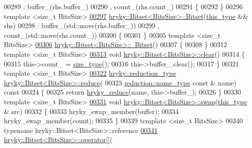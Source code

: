 \begin{DoxyCode}
00289     : buffer\_(rhs.buffer\_)
00290       , count\_(rhs.count\_)
00291 \{
00292 \}
00296 \textcolor{keyword}{template} <\textcolor{keywordtype}{size\_t} BitsSize>
\hypertarget{bitset_8h_source_l00297}{}\hyperlink{classhryky_1_1_bitset_ab29dc9adcba6fdf264f66a229ca7feed}{00297} \hyperlink{classhryky_1_1_bitset}{hryky::Bitset<BitsSize>::Bitset}(\hyperlink{classhryky_1_1_bitset}{this_type} && rhs)
00298     : buffer\_(std::move(rhs.buffer\_))
00299       , count\_(std::move(rhs.count\_))
00300 \{
00301 \}
00305 \textcolor{keyword}{template} <\textcolor{keywordtype}{size\_t} BitsSize>
\hypertarget{bitset_8h_source_l00306}{}\hyperlink{classhryky_1_1_bitset_ae6c8e0fd6959e423f6307cb71b74b595}{00306} \hyperlink{classhryky_1_1_bitset}{hryky::Bitset<BitsSize>::~Bitset}()
00307 \{
00308 \}
00312 \textcolor{keyword}{template} <\textcolor{keywordtype}{size\_t} BitsSize>
\hypertarget{bitset_8h_source_l00313}{}\hyperlink{classhryky_1_1_bitset_ae23f0938de9aeb3cae80fbc5ad4ffbe4}{00313} \textcolor{keywordtype}{void} \hyperlink{namespacehryky_aa201297ea9530da954a7230be71cc19d}{hryky::Bitset<BitsSize>::clear}()
00314 \{
00315     this->count\_ = \hyperlink{namespacehryky_1_1display_a88ee3bfa154cce4c6715af0c3f53d062}{size_type}();
00316     this->buffer\_.clear();
00317 \}
00321 \textcolor{keyword}{template} <\textcolor{keywordtype}{size\_t} BitsSize>
\hypertarget{bitset_8h_source_l00322}{}\hyperlink{classhryky_1_1_bitset_a1fe0a2bac8a887580781ef3d073dc120}{00322} \hyperlink{classhryky_1_1_intrusive_ptr}{hryky::reduction_type} \hyperlink{namespacehryky_af41cb3af6766761da0ff21b84527a52c}{hryky::Bitset<BitsSize>::reduce}(
00323     \hyperlink{classhryky_1_1reduction_1_1_string}{reduction::name_type} \textcolor{keyword}{const} & name)\textcolor{keyword}{ const}
00324 \textcolor{keyword}{}\{
00325     \textcolor{keywordflow}{return} \hyperlink{reduction__common_8h_afc72326c9900838c5db40438318794dd}{hryky_reduce}(name, this->buffer\_);
00326 \}
00330 \textcolor{keyword}{template} <\textcolor{keywordtype}{size\_t} BitsSize>
\hypertarget{bitset_8h_source_l00331}{}\hyperlink{classhryky_1_1_bitset_a85e9dae700136067e615b385ea8f4e14}{00331} \textcolor{keywordtype}{void} \hyperlink{namespacehryky_a4282146df5ea2b68cb667896a2205909}{hryky::Bitset<BitsSize>::swap}(\hyperlink{classhryky_1_1_bitset}{this_type} & src)
00332 \{
00333     hryky\_swap\_member(buffer);
00334     hryky\_swap\_member(count);
00335 \}
00339 \textcolor{keyword}{template} <\textcolor{keywordtype}{size\_t} BitsSize>
00340 \textcolor{keyword}{typename} hryky::Bitset<BitsSize>::reference
\hypertarget{bitset_8h_source_l00341}{}\hyperlink{classhryky_1_1_bitset_ae2c7a2634a3554fbbab8b16d60670d0d}{00341} \hyperlink{classhryky_1_1_bitset}{hryky::Bitset<BitsSize>::operator[]}(

\end{DoxyCode}
